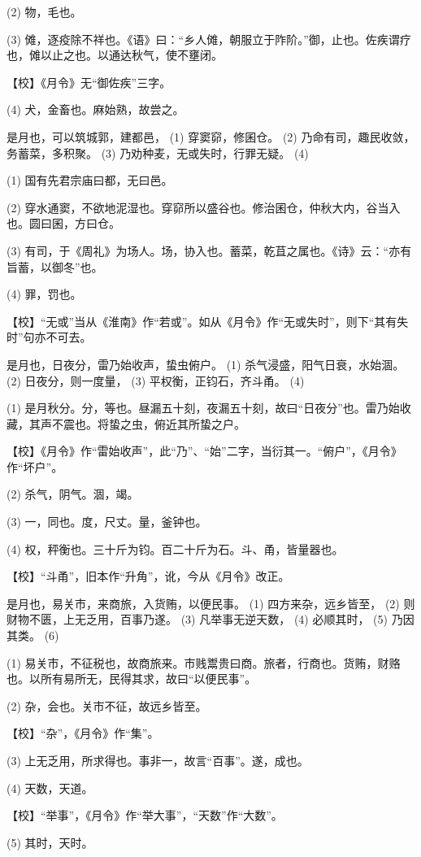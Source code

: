 \documentclass[12pt,UTF8]{ctexbook}
\begin{document}
(2) 物，毛也。

(3) 傩，逐疫除不祥也。《语》曰：“乡人傩，朝服立于阼阶。”御，止也。佐疾谓疗也，傩以止之也。以通达秋气，使不壅闭。

【校】《月令》无“御佐疾”三字。

(4) 犬，金畜也。麻始熟，故尝之。

是月也，可以筑城郭，建都邑， (1) 穿窦窌，修囷仓。 (2) 乃命有司，趣民收敛，务蓄菜，多积聚。 (3) 乃劝种麦，无或失时，行罪无疑。 (4)

(1) 国有先君宗庙曰都，无曰邑。

(2) 穿水通窦，不欲地泥湿也。穿窌所以盛谷也。修治囷仓，仲秋大内，谷当入也。圆曰囷，方曰仓。

(3) 有司，于《周礼》为场人。场，协入也。蓄菜，乾苴之属也。《诗》云：“亦有旨蓄，以御冬”也。

(4) 罪，罚也。

【校】“无或”当从《淮南》作“若或”。如从《月令》作“无或失时”，则下“其有失时”句亦不可去。

是月也，日夜分，雷乃始收声，蛰虫俯户。 (1) 杀气浸盛，阳气日衰，水始涸。 (2) 日夜分，则一度量， (3) 平权衡，正钧石，齐斗甬。 (4)

(1) 是月秋分。分，等也。昼漏五十刻，夜漏五十刻，故曰“日夜分”也。雷乃始收藏，其声不震也。将蛰之虫，俯近其所蛰之户。

【校】《月令》作“雷始收声”，此“乃”、“始”二字，当衍其一。“俯户”，《月令》作“坏户”。

(2) 杀气，阴气。涸，竭。

(3) 一，同也。度，尺丈。量，釜钟也。

(4) 权，秤衡也。三十斤为钧。百二十斤为石。斗、甬，皆量器也。

【校】“斗甬”，旧本作“升角”，讹，今从《月令》改正。

是月也，易关市，来商旅，入货贿，以便民事。 (1) 四方来杂，远乡皆至， (2) 则财物不匮，上无乏用，百事乃遂。 (3) 凡举事无逆天数， (4) 必顺其时， (5) 乃因其类。 (6)

(1) 易关市，不征税也，故商旅来。市贱鬻贵曰商。旅者，行商也。货贿，财赂也。以所有易所无，民得其求，故曰“以便民事”。

(2) 杂，会也。关市不征，故远乡皆至。

【校】“杂”，《月令》作“集”。

(3) 上无乏用，所求得也。事非一，故言“百事”。遂，成也。

(4) 天数，天道。

【校】“举事”，《月令》作“举大事”，“天数”作“大数”。

(5) 其时，天时。
\end{document}

